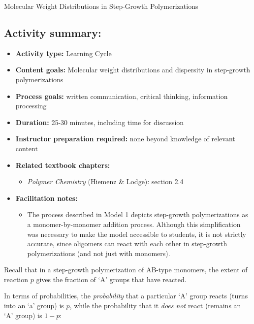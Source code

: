 \begin{activity}{Molecular Weight Distributions in Step-Growth Polymerizations}
\begin{instructornotes}
	\subsection*{Activity summary:}
	\begin{itemize}
		\item \textbf{Activity type:} Learning Cycle
		\item \textbf{Content goals:} Molecular weight distributions and dispersity in step-growth polymerizations
		\item \textbf{Process goals:} %
			written communication, critical thinking, information processing
		\item \textbf{Duration:} 25-30 minutes, including time for discussion
		\item \textbf{Instructor preparation required:} none beyond knowledge of relevant content
		\item \textbf{Related textbook chapters:}
			\begin{itemize}
				\item \emph{Polymer Chemistry} (Hiemenz \& Lodge): section 2.4
			\end{itemize}
		\item \textbf{Facilitation notes:}
			\begin{itemize}
				\item The process described in Model 1 depicts step-growth polymerizations as a monomer-by-monomer addition process.  Although this simplification was necessary to make the model accessible to students, it is not strictly accurate, since oligomers can react with each other in step-growth polymerizations (and not just with monomers).
			\end{itemize}
	\end{itemize}

\end{instructornotes}


\begin{model}
\label{\labelbase:mdl:probabilities}

Recall that in a step-growth polymerization of AB-type monomers, the extent of reaction $p$ gives the fraction of `A' groups that have reacted.

In terms of probabilities, the \emph{probability} that a particular `A' group reacts (turns into an `a' group) is $p$, while the probability that it \emph{does not} react (remains an `A' group) is $1-p$:


\end{model}
\end{activity}
